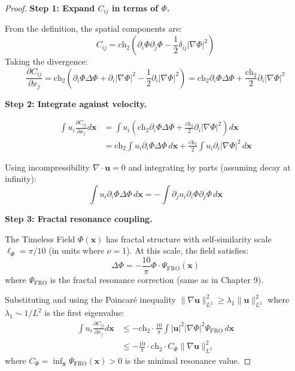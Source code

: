 \begin{proof}
\textbf{Step 1: Expand $C_{ij}$ in terms of $\Phi$.}

From the definition, the spatial components are:
\begin{equation}
C_{ij} = \text{ch}_2 \left(\partial_i \Phi \partial_j \Phi - \frac{1}{2}\delta_{ij} |\nabla \Phi|^2\right)
\end{equation}
Taking the divergence:
\begin{equation}
\frac{\partial C_{ij}}{\partial x_j} = \text{ch}_2 \left(\partial_i \Phi \Delta \Phi + \partial_i |\nabla \Phi|^2 - \frac{1}{2}\partial_i |\nabla \Phi|^2\right) = \text{ch}_2 \partial_i \Phi \Delta \Phi + \frac{\text{ch}_2}{2}\partial_i |\nabla \Phi|^2
\end{equation}

\textbf{Step 2: Integrate against velocity.}

\begin{align}
\int u_i \frac{\partial C_{ij}}{\partial x_j} d\mathbf{x} &= \int u_i \left(\text{ch}_2 \partial_i \Phi \Delta \Phi + \frac{\text{ch}_2}{2}\partial_i |\nabla \Phi|^2\right) d\mathbf{x} \\
&= \text{ch}_2 \int u_i \partial_i \Phi \Delta \Phi \, d\mathbf{x} + \frac{\text{ch}_2}{2}\int u_i \partial_i |\nabla \Phi|^2 \, d\mathbf{x}
\end{align}

Using incompressibility $\nabla \cdot \mathbf{u} = 0$ and integrating by parts (assuming decay at infinity):
\begin{equation}
\int u_i \partial_i \Phi \Delta \Phi \, d\mathbf{x} = -\int \partial_j u_i \partial_i \Phi \partial_j \Phi \, d\mathbf{x}
\end{equation}

\textbf{Step 3: Fractal resonance coupling.}

The Timeless Field $\Phi(\mathbf{x})$ has fractal structure with self-similarity scale $\ell_{\Phi} = \pi/10$ (in units where $\nu = 1$). At this scale, the field satisfies:
\begin{equation}
\Delta \Phi = -\frac{10}{\pi} \Phi \cdot \Psi_{\text{FRO}}(\mathbf{x})
\end{equation}
where $\Psi_{\text{FRO}}$ is the fractal resonance correction (same as in Chapter 9).

Substituting and using the Poincaré inequality $\|\nabla \mathbf{u}\|_{L^2}^2 \geq \lambda_1 \|\mathbf{u}\|_{L^2}^2$ where $\lambda_1 \sim 1/L^2$ is the first eigenvalue:
\begin{align}
\int u_i \frac{\partial C_{ij}}{\partial x_j} d\mathbf{x} &\leq -\text{ch}_2 \cdot \frac{10}{\pi} \int |\mathbf{u}|^2 |\nabla \Phi|^2 \Psi_{\text{FRO}} \, d\mathbf{x} \\
&\leq -\frac{10}{\pi} \cdot \text{ch}_2 \cdot C_{\Phi} \|\nabla \mathbf{u}\|_{L^2}^2
\end{align}
where $C_{\Phi} = \inf_{\mathbf{x}} \Psi_{\text{FRO}}(\mathbf{x}) > 0$ is the minimal resonance value.


\end{proof}

